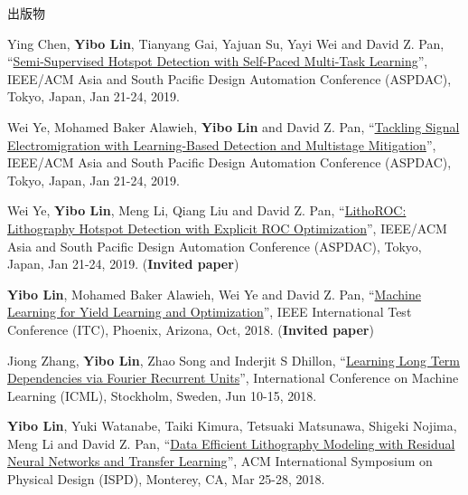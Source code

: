\begin{rSection}{出版物}
\begin{description}[font=\normalfont]
{}
            

\item[{[C21]}]{
        Ying Chen, \textbf{Yibo Lin}, Tianyang Gai, Yajuan Su, Yayi Wei and David Z. Pan, 
    ``\href{https://doi.org/10.1145/3287624.3287685}{Semi-Supervised Hotspot Detection with Self-Paced Multi-Task Learning}'', 
    IEEE/ACM Asia and South Pacific Design Automation Conference (ASPDAC), Tokyo, Japan, Jan 21-24, 2019.
    
}
            

\item[{[C20]}]{
        Wei Ye, Mohamed Baker Alawieh, \textbf{Yibo Lin} and David Z. Pan, 
    ``\href{https://doi.org/10.1145/3287624.3287688}{Tackling Signal Electromigration with Learning-Based Detection and Multistage Mitigation}'', 
    IEEE/ACM Asia and South Pacific Design Automation Conference (ASPDAC), Tokyo, Japan, Jan 21-24, 2019.
    
}
            

\item[{[C19]}]{
        Wei Ye, \textbf{Yibo Lin}, Meng Li, Qiang Liu and David Z. Pan, 
    ``\href{https://doi.org/10.1145/3287624.3288746}{LithoROC: Lithography Hotspot Detection with Explicit ROC Optimization}'', 
    IEEE/ACM Asia and South Pacific Design Automation Conference (ASPDAC), Tokyo, Japan, Jan 21-24, 2019.
    (\textbf{Invited paper})
}
            

\item[{[C18]}]{
        \textbf{Yibo Lin}, Mohamed Baker Alawieh, Wei Ye and David Z. Pan, 
    ``\href{https://doi.org/10.1109/TEST.2018.8624733}{Machine Learning for Yield Learning and Optimization}'', 
    IEEE International Test Conference (ITC), Phoenix, Arizona, Oct, 2018.
    (\textbf{Invited paper})
}
            

\item[{[C17]}]{
        Jiong Zhang, \textbf{Yibo Lin}, Zhao Song and Inderjit S Dhillon, 
    ``\href{https://arxiv.org/pdf/1803.06585.pdf}{Learning Long Term Dependencies via Fourier Recurrent Units}'', 
    International Conference on Machine Learning (ICML), Stockholm, Sweden, Jun 10-15, 2018.
    
}
            

\item[{[C16]}]{
        \textbf{Yibo Lin}, Yuki Watanabe, Taiki Kimura, Tetsuaki Matsunawa, Shigeki Nojima, Meng Li and David Z. Pan, 
    ``\href{https://doi.org/10.1145/3177540.3178242}{Data Efficient Lithography Modeling with Residual Neural Networks and Transfer Learning}'', 
    ACM International Symposium on Physical Design (ISPD), Monterey, CA, Mar 25-28, 2018.
    
}
\end{description}
\end{rSection}
